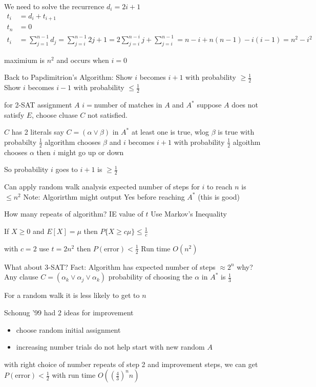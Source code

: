 \documentclass[english,12pt]{article}
\theoremstyle{plain}
\theoremstyle{definition}
\theoremstyle{definition} %
\begin{document}
We need to solve the recurrence $d_i=2i+1$
\begin{align*}
t_i &= d_i+t_{i+1}\\
t_n&=0\\
t_i&=\sum_{j=1}^{n-1}d_j
=\sum_{j=i}^{n-1}2j+1
=2\sum_{j=i}^{n-i}j+\sum_{j=i}^{n-1}
=n-i+n(n-1)-i(i-1)
=n^2-i^2
\end{align*}

maximium is $n^2$ and occurs when $i=0$

Back to Papdimitrion's Algorithm:
Show $i$ becomes $i+1$ with probability $\ge\frac{1}{2}$
Show $i$ becomes $i-1$ with probability $\le\frac{1}{2}$

for 2-SAT
assignment $A$
$i=$number of matches in $A$ and $A^\ast$
suppose $A$ does not satisfy $E$, choose cluase $C$ not satisfied.

$C$ has 2 literals say $C=(\alpha \vee \beta)$
in $A^\ast$ at least one is true, wlog $\beta$ is true
with probabilty $\frac{1}{2}$ algorithm chooses $\beta$ and $i$ becomes $i+1$
with probability $\frac{1}{2}$ algoithm chooses $\alpha$ then $i$ might go up or down

So probability $i$ goes to $i+1$ is $\ge\frac{1}{2}$

Can apply random walk analysis
expected number of steps for $i$ to reach $n$ is $\le n^2$
Note: Algorirthm might output Yes before reaching $A^\ast$ (this is good)

How many repeats of algorithm? IE value of $t$
Use Markov's Inequality

If $X\ge 0$ and $E\left[X\right]=\mu$ then $P\{X\ge c\mu\}\le \frac{1}{c}$

with $c=2$
use $t=2n^2$
then $P(\text{error})<\frac{1}{2}$
Run time $O(n^2)$

What about 3-SAT?
Fact: Algorithm has expected number of steps $\approx 2^n$
why?
Any clause $C=(\alpha_k\vee\alpha_j\vee\alpha_k)$
probability of choosing the $\alpha$ in $A^\ast$ is $\frac{1}{3}$

For a random walk it is less likely to get to $n$

Schonug '99 had 2 ideas for improvement
\begin{itemize}
\item choose random initial assignment
\item increasing number trials do not help start with new random $A$
\end{itemize}

with right choice of number repeats of step 2 and improvement steps, we can get $P(\text{error})<\frac{1}{2}$ with run time $O\left(\left(\frac{4}{3}\right)^nn\right)$
\end{document}
